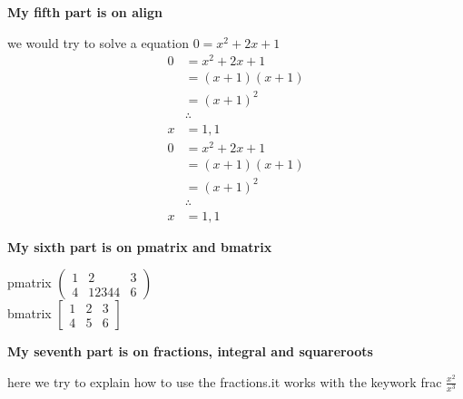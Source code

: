 \documentclass{article}
\begin{document}
    \noindent \textbf{My fifth part is on align}


    \noindent we would try to solve a equation $0=x^2+2x+1$
    \begin{align}
        0 &= x^2+2x+1 \\
          &= (x+1)(x+1) \\
          &= (x+1)^2    \\
          & \therefore  \\
        x &= 1 ,1      
    \end{align}
    \begin{align*}
        0 &= x^2+2x+1 \\
          &= (x+1)(x+1) \\
          &= (x+1)^2    \\
          & \therefore  \\
        x &= 1 ,1      
    \end{align*}

    \noindent \textbf{My sixth part is on pmatrix and bmatrix}

    \noindent pmatrix
    $
    \begin{pmatrix}
        1 & 2 &3 \\
        4 &12344&6
    \end{pmatrix}
    $\\
    bmatrix
    $
    \begin{bmatrix}
        1 & 2 &3 \\
        4 &5&6
    \end{bmatrix}
    $


    \noindent \textbf{My seventh part is on fractions, integral and
    squareroots}

    \noindent here we try to explain how to use the fractions.it
    works with the keywork frac $\frac{x^2}{x^3}$
\end{document}
